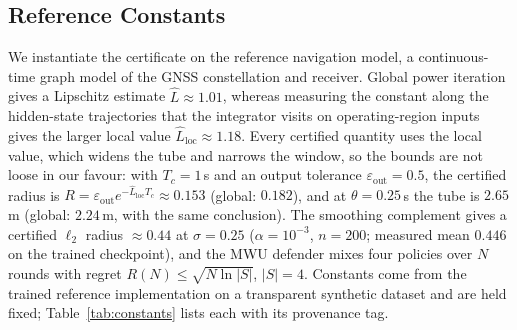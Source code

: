 \documentclass[conference,letterpaper,10pt]{IEEEtran}   %
\begin{document}
\subsection{Reference Constants}
We instantiate the certificate on the reference navigation model, a
continuous-time graph model of the GNSS constellation and receiver. Global
power iteration gives a Lipschitz estimate $\hat L\approx1.01$, whereas
measuring the constant along the hidden-state trajectories that the integrator
visits on operating-region inputs gives the larger local value
$\hat L_{\mathrm{loc}}\approx1.18$. Every certified quantity uses the local
value, which widens the tube and narrows the window, so the bounds are not
loose in our favour: with $T_c=1$\,s and an output tolerance
$\varepsilon_{\mathrm{out}}=0.5$, the certified radius is
$R=\varepsilon_{\mathrm{out}}e^{-\hat L_{\mathrm{loc}}T_c}\approx0.153$
(global: $0.182$), and at $\theta{=}0.25$\,s the tube is $2.65$\,m (global:
$2.24$\,m, with the same conclusion). The smoothing complement gives a certified $\ell_2$ radius
$\approx0.44$ at $\sigma=0.25$ ($\alpha=10^{-3}$, $n=200$; measured mean
$0.446$ on the trained checkpoint), and the MWU defender mixes four policies
over $N$ rounds with regret $R(N)\le\sqrt{N\ln|S|}$, $|S|=4$. Constants come from
the trained reference implementation on a transparent synthetic dataset and are
held fixed; Table~\ref{tab:constants} lists each with its provenance tag.

\begin{table}[t]
\centering
\caption{Instantiated constants and their provenance. The only numeric constant
still pending is the PAC-Bayes prior/posterior KL, which is flagged rather than
substituted. RS denotes randomised smoothing and IQ in-phase and quadrature.}
\label{tab:constants}
\footnotesize
\renewcommand{\arraystretch}{1.05}

\end{table}
\end{document}
